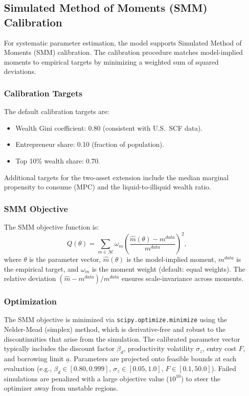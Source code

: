 \documentclass[12pt]{article}
\newcommand{\calM}{\mathcal{M}}
\begin{document}
\subsection{Simulated Method of Moments (SMM) Calibration}\label{sec:smm}

For systematic parameter estimation, the model supports Simulated Method of Moments (SMM) calibration. The calibration procedure matches model-implied moments to empirical targets by minimizing a weighted sum of squared deviations.

\subsubsection{Calibration Targets}

The default calibration targets are:
\begin{itemize}
  \item Wealth Gini coefficient: 0.80 (consistent with U.S.\ SCF data).
  \item Entrepreneur share: 0.10 (fraction of population).
  \item Top 10\% wealth share: 0.70.
\end{itemize}
Additional targets for the two-asset extension include the median marginal propensity to consume (MPC) and the liquid-to-illiquid wealth ratio.

\subsubsection{SMM Objective}

The SMM objective function is:
\begin{equation}\label{eq:smm}
  Q(\theta) = \sum_{m \in \calM} \omega_m \left(\frac{\hat{m}(\theta) - m^{data}}{m^{data}}\right)^2,
\end{equation}
where $\theta$ is the parameter vector, $\hat{m}(\theta)$ is the model-implied moment, $m^{data}$ is the empirical target, and $\omega_m$ is the moment weight (default: equal weights). The relative deviation $(\hat{m} - m^{data})/m^{data}$ ensures scale-invariance across moments.

\subsubsection{Optimization}

The SMM objective is minimized via \texttt{scipy.optimize.minimize} using the Nelder-Mead (simplex) method, which is derivative-free and robust to the discontinuities that arise from the simulation. The calibrated parameter vector typically includes the discount factor $\beta_d$, productivity volatility $\sigma_z$, entry cost $F$, and borrowing limit $\underline{a}$. Parameters are projected onto feasible bounds at each evaluation (e.g., $\beta_d \in [0.80, 0.999]$, $\sigma_z \in [0.05, 1.0]$, $F \in [0.1, 50.0]$). Failed simulations are penalized with a large objective value ($10^{10}$) to steer the optimizer away from unstable regions.
\end{document}

